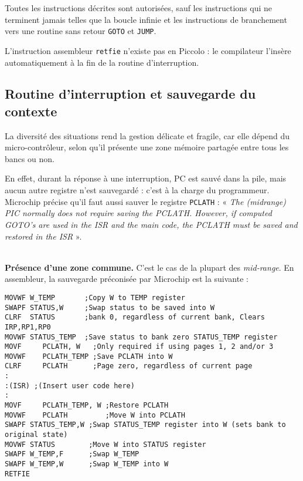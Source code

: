 Toutes les instructions décrites sont autorisées, sauf les instructions qui ne terminent jamais telles que la boucle infinie et les instructions de branchement vers une routine sans retour \texttt{GOTO} et \texttt{JUMP}.

L’instruction assembleur \texttt{retfie} n’existe pas en Piccolo : le compilateur l’insère automatiquement à la fin de la routine d’interruption.


\subsection{Routine d’interruption et sauvegarde du contexte}

La diversité des situations rend la gestion délicate et fragile, car elle dépend du micro-contrôleur, selon qu'il présente une zone mémoire partagée entre tous les bancs ou non.

En effet, durant la réponse à une interruption, PC est sauvé dans la pile, mais aucun autre registre n’est sauvegardé : c’est à la charge du programmeur. Microchip précise qu’il faut aussi sauver le registre \texttt{PCLATH} : « \emph{The (midrange) PIC normally does not require saving the PCLATH. However, if computed GOTO’s are used in the ISR and the main code, the PCLATH must be saved and restored in the ISR} ».



~\\
\textbf{Présence d’une zone commune.} C'est le cas de la plupart des \emph{mid-range}. En assembleur, la sauvegarde préconisée par Microchip est la suivante :

\begin{lstlisting}[language=assembleur]
MOVWF W_TEMP       ;Copy W to TEMP register 
SWAPF STATUS,W     ;Swap status to be saved into W 
CLRF  STATUS       ;bank 0, regardless of current bank, Clears IRP,RP1,RP0 
MOVWF STATUS_TEMP  ;Save status to bank zero STATUS_TEMP register 
MOVF     PCLATH, W   ;Only required if using pages 1, 2 and/or 3 
MOVWF    PCLATH_TEMP ;Save PCLATH into W 
CLRF     PCLATH      ;Page zero, regardless of current page 
: 
:(ISR) ;(Insert user code here) 
: 
MOVF     PCLATH_TEMP, W ;Restore PCLATH 
MOVWF    PCLATH         ;Move W into PCLATH 
SWAPF STATUS_TEMP,W ;Swap STATUS_TEMP register into W (sets bank to original state) 
MOVWF STATUS        ;Move W into STATUS register 
SWAPF W_TEMP,F      ;Swap W_TEMP 
SWAPF W_TEMP,W      ;Swap W_TEMP into W
RETFIE
\end{lstlisting}

